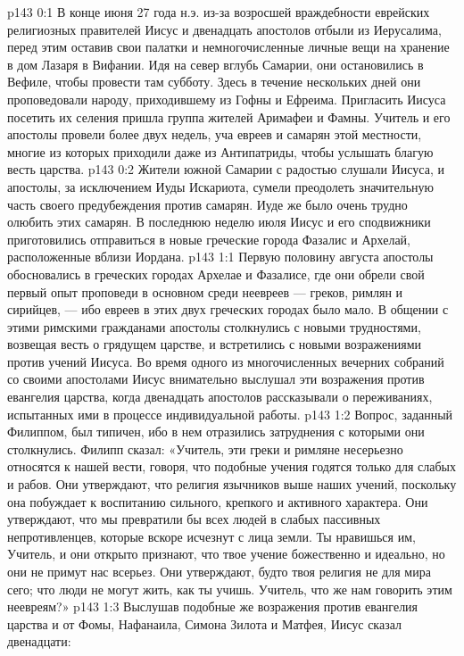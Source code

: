 \vs p143 0:1 В конце июня 27 года н.э. из\hyp{}за возросшей враждебности еврейских религиозных правителей Иисус и двенадцать апостолов отбыли из Иерусалима, перед этим оставив свои палатки и немногочисленные личные вещи на хранение в дом Лазаря в Вифании. Идя на север вглубь Самарии, они остановились в Вефиле, чтобы провести там субботу. Здесь в течение нескольких дней они проповедовали народу, приходившему из Гофны и Ефреима. Пригласить Иисуса посетить их селения пришла группа жителей Аримафеи и Фамны. Учитель и его апостолы провели более двух недель, уча евреев и самарян этой местности, многие из которых приходили даже из Антипатриды, чтобы услышать благую весть царства.
\vs p143 0:2 Жители южной Самарии с радостью слушали Иисуса, и апостолы, за исключением Иуды Искариота, сумели преодолеть значительную часть своего предубеждения против самарян. Иуде же было очень трудно олюбить этих самарян. В последнюю неделю июля Иисус и его сподвижники приготовились отправиться в новые греческие города Фазалис и Архелай, расположенные вблизи Иордана.
\vs p143 1:1 Первую половину августа апостолы обосновались в греческих городах Архелае и Фазалисе, где они обрели свой первый опыт проповеди в основном среди неевреев --- греков, римлян и сирийцев, --- ибо евреев в этих двух греческих городах было мало. В общении с этими римскими гражданами апостолы столкнулись с новыми трудностями, возвещая весть о грядущем царстве, и встретились с новыми возражениями против учений Иисуса. Во время одного из многочисленных вечерних собраний со своими апостолами Иисус внимательно выслушал эти возражения против евангелия царства, когда двенадцать апостолов рассказывали о переживаниях, испытанных ими в процессе индивидуальной работы.
\vs p143 1:2 Вопрос, заданный Филиппом, был типичен, ибо в нем отразились затруднения с которыми они столкнулись. Филипп сказал: «Учитель, эти греки и римляне несерьезно относятся к нашей вести, говоря, что подобные учения годятся только для слабых и рабов. Они утверждают, что религия язычников выше наших учений, поскольку она побуждает к воспитанию сильного, крепкого и активного характера. Они утверждают, что мы превратили бы всех людей в слабых пассивных непротивленцев, которые вскоре исчезнут с лица земли. Ты нравишься им, Учитель, и они открыто признают, что твое учение божественно и идеально, но они не примут нас всерьез. Они утверждают, будто твоя религия не для мира сего; что люди не могут жить, как ты учишь. Учитель, что же нам говорить этим неевреям?»
\vs p143 1:3 Выслушав подобные же возражения против евангелия царства и от Фомы, Нафанаила, Симона Зилота и Матфея, Иисус сказал двенадцати:
